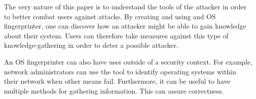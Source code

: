The very nature of this paper is to understand the tools of the attacker in order to better combat users against attacks. By creating and using and OS fingerprinter, one can discover how an attacker might be able to gain knowledge about their system. Users can therefore take measures against this type of knowledge-gathering in order to deter a possible attacker.

An OS fingerprinter can also have uses outside of a security context. For example, network administrators can use the tool to identify operating systems within their network when other means fail. Furthermore, it can be useful to have multiple methods for gathering information. This can assure correctness.